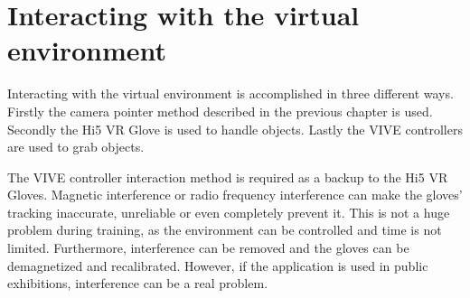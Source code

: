 \documentclass[12pt, a4paper,oneside, nocenter]{thesis}
\begin{document}
\section{Interacting with the virtual environment}
Interacting with the virtual environment is accomplished in three different ways. Firstly the camera pointer method described in the previous chapter is used. Secondly the Hi5 VR Glove is used to handle objects. Lastly the VIVE controllers are used to grab objects.
\par
The VIVE controller interaction method is required as a backup to the Hi5 VR Gloves. Magnetic interference or radio frequency interference can make the gloves' tracking inaccurate, unreliable or even completely prevent it. This is not a huge problem during training, as the environment can be controlled and time is not limited. Furthermore, interference can be removed and the gloves can be demagnetized and recalibrated. However, if the application is used in public exhibitions, interference can be a real problem.
\end{document}
